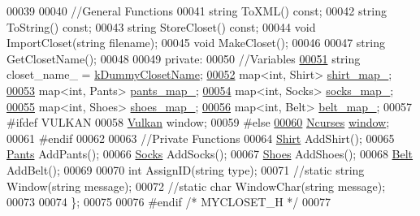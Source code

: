\begin{DoxyCode}
00039 
00040     \textcolor{comment}{//General Functions}
00041     \textcolor{keywordtype}{string} ToXML() \textcolor{keyword}{const};
00042     \textcolor{keywordtype}{string} ToString() \textcolor{keyword}{const};
00043     \textcolor{keywordtype}{string} StoreCloset() \textcolor{keyword}{const};
00044     \textcolor{keywordtype}{void} ImportCloset(\textcolor{keywordtype}{string} filename);
00045     \textcolor{keywordtype}{void} MakeCloset();
00046 
00047     \textcolor{keywordtype}{string} GetClosetName();
00048 
00049   \textcolor{keyword}{private}:
00050     \textcolor{comment}{//Variables}
\mbox{\hyperlink{classCloset_a3c06676b90e6ebe31d6dd276f2f0bcef}{00051}}     \textcolor{keywordtype}{string} closet\_name\_ = \mbox{\hyperlink{myCloset_8h_abe246d8af0c0b6020aa175c2874b59be}{kDummyClosetName}};
\mbox{\hyperlink{classCloset_a8126a023a2777b84b23436da8d1f4b35}{00052}}     map<int, Shirt> \mbox{\hyperlink{classCloset_a8126a023a2777b84b23436da8d1f4b35}{shirt\_map\_}};
\mbox{\hyperlink{classCloset_a8be78859dfab9e2aa09bfbbb8f191dab}{00053}}     map<int, Pants> \mbox{\hyperlink{classCloset_a8be78859dfab9e2aa09bfbbb8f191dab}{pants\_map\_}};
\mbox{\hyperlink{classCloset_a33a48dfc5ef542261bb0dd373f899f9e}{00054}}     map<int, Socks> \mbox{\hyperlink{classCloset_a33a48dfc5ef542261bb0dd373f899f9e}{socks\_map\_}};
\mbox{\hyperlink{classCloset_ab1e1ce9110a044c90244407f0f6f92c4}{00055}}     map<int, Shoes> \mbox{\hyperlink{classCloset_ab1e1ce9110a044c90244407f0f6f92c4}{shoes\_map\_}};
\mbox{\hyperlink{classCloset_a0631fe46e3c955109a613e1cd1d2cb52}{00056}}     map<int, Belt> \mbox{\hyperlink{classCloset_a0631fe46e3c955109a613e1cd1d2cb52}{belt\_map\_}};
00057 \textcolor{preprocessor}{#ifdef VULKAN}
00058     \mbox{\hyperlink{classVulkan}{Vulkan}} window;
00059 \textcolor{preprocessor}{#else}
\mbox{\hyperlink{classCloset_af1eb4f786cc4eccd3018b90632236a93}{00060}}     \mbox{\hyperlink{classNcurses}{Ncurses}} \mbox{\hyperlink{classCloset_af1eb4f786cc4eccd3018b90632236a93}{window}};
00061 \textcolor{preprocessor}{#endif}
00062 
00063     \textcolor{comment}{//Private Functions}
00064     \mbox{\hyperlink{classShirt}{Shirt}} AddShirt();
00065     \mbox{\hyperlink{classPants}{Pants}} AddPants();
00066     \mbox{\hyperlink{classSocks}{Socks}} AddSocks();
00067     \mbox{\hyperlink{classShoes}{Shoes}} AddShoes();
00068     \mbox{\hyperlink{classBelt}{Belt}} AddBelt();
00069     
00070     \textcolor{keywordtype}{int} AssignID(\textcolor{keywordtype}{string} type);
00071     \textcolor{comment}{//static string Window(string message);}
00072     \textcolor{comment}{//static char WindowChar(string message);}
00073 
00074 \};
00075 
00076 \textcolor{preprocessor}{#endif }\textcolor{comment}{/* MYCLOSET\_H */}\textcolor{preprocessor}{}
00077 
\end{DoxyCode}
